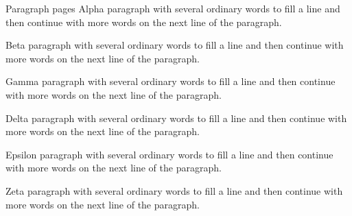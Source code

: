 \documentclass{beamer}
\begin{document}
\begin{frame}[allowframebreaks=.75]{Paragraph pages}
Alpha paragraph with several ordinary words to fill a line and then continue with more words on the next line of the paragraph.\par
\rule{0pt}{50pt}Beta paragraph with several ordinary words to fill a line and then continue with more words on the next line of the paragraph.\par
\rule{0pt}{50pt}Gamma paragraph with several ordinary words to fill a line and then continue with more words on the next line of the paragraph.\par
\rule{0pt}{50pt}Delta paragraph with several ordinary words to fill a line and then continue with more words on the next line of the paragraph.\par
\rule{0pt}{50pt}Epsilon paragraph with several ordinary words to fill a line and then continue with more words on the next line of the paragraph.\par
\rule{0pt}{50pt}Zeta paragraph with several ordinary words to fill a line and then continue with more words on the next line of the paragraph.
\end{frame}
\end{document}
